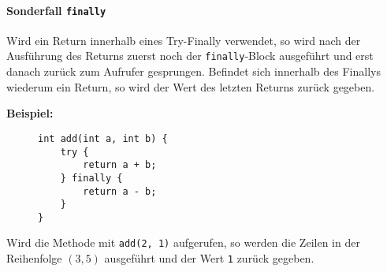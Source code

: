 	\paragraph{Sonderfall \texttt{finally}}
		Wird ein Return innerhalb eines Try-Finally verwendet, so wird nach der Ausführung des Returns zuerst noch der \lstinline|finally|-Block ausgeführt und erst danach zurück zum Aufrufer gesprungen. Befindet sich innerhalb des Finallys wiederum ein Return, so wird der Wert des letzten Returns zurück gegeben.
		
		\textbf{Beispiel:}
		\begin{figure}[H]
			\centering
			\begin{lstlisting}
int add(int a, int b) {
	try {
		return a + b;
	} finally {
		return a - b;
	}
}
\end{lstlisting}
		\end{figure}
		Wird die Methode mit \lstinline|add(2, 1)| aufgerufen, so werden die Zeilen in der Reihenfolge \( (3, 5) \) ausgeführt und der Wert \lstinline|1| zurück gegeben.

